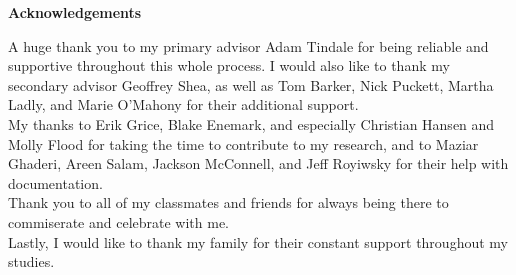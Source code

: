 \begin{center}
\large\textbf{Acknowledgements}
\end{center}

\noindent
A huge thank you to my primary advisor Adam Tindale for being reliable and supportive throughout this whole process. I would also like to thank my secondary advisor Geoffrey Shea, as well as Tom Barker, Nick Puckett, Martha Ladly, and Marie O'Mahony for their additional support.
\\[0.3cm]
My thanks to Erik Grice, Blake Enemark, and especially Christian Hansen and Molly Flood for taking the time to contribute to my research, and to Maziar Ghaderi, Areen Salam, Jackson McConnell, and Jeff Royiwsky for their help with documentation.
\\[0.3cm]
Thank you to all of my classmates and friends for always being there to commiserate and celebrate with me.
\\[0.3cm]
Lastly, I would like to thank my family for their constant support throughout my studies.


